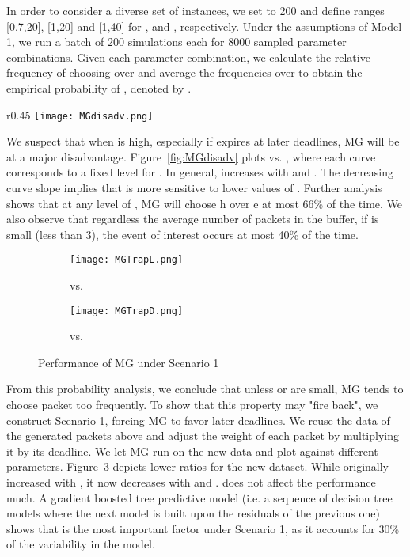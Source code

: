 \documentclass[oribibl]{llncs}
\begin{document}
In order to consider a diverse set of instances, we set  to 200 and
define ranges [0.7,20], [1,20] and [1,40] for ,  and
, respectively. Under the assumptions of Model 1, we run a
batch of 200 simulations each for 8000 sampled parameter combinations. Given
each parameter combination, we calculate the relative frequency of
choosing  over  and average the frequencies over  to
obtain the empirical probability of , denoted by
. 

\begin{wrapfigure}[15]{r}{0.45\textwidth}\centering
\vspace{-18pt}
\texttt{[image: MGdisadv.png]} 
\caption{ vs. , colored by }
\label{fig:MGdisadv}
\end{wrapfigure}

We suspect that when  is high, especially if  expires
at later deadlines, MG will  be at a major
disadvantage. Figure~\ref{fig:MGdisadv} plots  vs. ,
where each curve corresponds to a fixed level for . In
general,  increases with  and
. The decreasing curve slope implies that  is more
sensitive to lower values of . Further analysis shows that at
any level of , MG will
choose h over e at most 66\% of the time. We also observe that regardless the average number of
packets in the buffer, if  is small (less than 3), 
the event of interest occurs at most 40\% of the time.



\begin{figure}[ht]\centering
\begin{subfigure}{.48\textwidth}
  \centering
  \texttt{[image: MGTrapL.png]}
  \caption{ vs. }
  \label{fig:MGtrapL}
\end{subfigure}
\begin{subfigure}{.48\textwidth}
  \centering
  \texttt{[image: MGTrapD.png]}
  \caption{ vs. }
  \label{fig:MGtrapD}
\end{subfigure}
\caption{Performance of MG under Scenario 1}
\label{fig:MGtrap}
\end{figure}

\vspace{-24pt} 
From this probability analysis, we conclude that unless
 or  are small, MG tends to choose packet  too
frequently. To show that this property may "fire back", we construct
Scenario 1, forcing MG to favor later deadlines. We reuse the data of
the generated packets above and adjust the weight of each packet by
multiplying it by its deadline. We let MG run on the new data and plot
 against different parameters. Figure~\ref{fig:MGtrap}
depicts lower ratios for the new dataset. While  originally
increased with , it now decreases with  and
.  does not affect the performance much. A gradient
boosted tree predictive model (i.e. a sequence of decision tree models
where the next model is built upon the residuals of the previous one)
shows that  is the most important factor under Scenario 1, as
it accounts for 30\% of the variability in the model.
\end{document}
